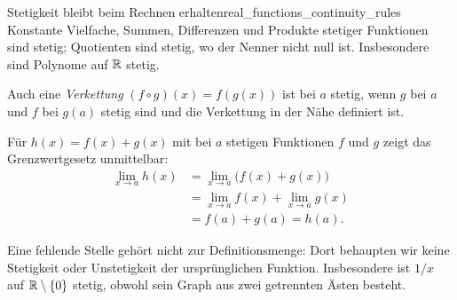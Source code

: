 \begin{TheoremBox}{Stetigkeit bleibt beim Rechnen erhalten}{real_functions_continuity_rules}
  Konstante Vielfache, Summen, Differenzen und Produkte stetiger Funktionen sind stetig;
  Quotienten sind stetig, wo der Nenner nicht null ist.
  Insbesondere sind Polynome auf $\mathbb{R}$ stetig.

  Auch eine \emph{Verkettung} 
  $(f\circ g)(x)=f(g(x))$ ist bei $a$ stetig, wenn $g$ bei $a$ und
  $f$ bei $g(a)$ stetig sind und die Verkettung in der Nähe definiert ist.
\end{TheoremBox}
Für $h(x)=f(x)+g(x)$ mit bei $a$ stetigen Funktionen $f$ und $g$
zeigt das Grenzwertgesetz unmittelbar:
\[
  \begin{aligned}
    \lim_{x\to a}h(x)
      &=\lim_{x\to a}\bigl(f(x)+g(x)\bigr)\\
      &=\lim_{x\to a}f(x)+\lim_{x\to a}g(x)\\
      &=f(a)+g(a)=h(a).
  \end{aligned}
\]
\begin{RemarkBox}[remark title=Stetigkeit und Definitionsmenge]
  Eine fehlende Stelle gehört nicht zur Definitionsmenge: Dort behaupten
  wir keine Stetigkeit oder Unstetigkeit der ursprünglichen Funktion.
  Insbesondere ist $1/x$ auf $\mathbb{R}\setminus\{0\}$ stetig, obwohl sein
  Graph aus zwei getrennten Ästen besteht.
\end{RemarkBox}

